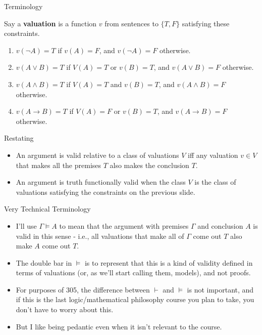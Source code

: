 \documentclass[
  ignorenonframetext,
]{beamer}
\providecommand{\tightlist}{%
  \setlength{\itemsep}{0pt}\setlength{\parskip}{0pt}}
\renewcommand{\,}{\text{, }}
\begin{document}
\begin{frame}{Terminology}
\protect\hypertarget{terminology}{}

Say a \textbf{valuation} is a function \(v\) from sentences to
\(\{T, F\}\) satisfying these constraints.

\begin{enumerate}
\tightlist
\item
  \(v(\neg A) = T\) if \(v(A) = F\), and \(v(\neg A) = F\) otherwise.
\item
  \(v(A \vee B) = T\) if \(V(A) = T\) or \(v(B) = T\), and
  \(v(A \vee B) = F\) otherwise.
\item
  \(v(A \wedge B) = T\) if \(V(A) = T\) and \(v(B) = T\), and
  \(v(A \wedge B) = F\) otherwise.
\item
  \(v(A \rightarrow B) = T\) if \(V(A) = F\) or \(v(B) = T\), and
  \(v(A \rightarrow B) = F\) otherwise.
\end{enumerate}

\end{frame}

\begin{frame}{Restating}
\protect\hypertarget{restating}{}

\begin{itemize}[<+->]
\tightlist
\item
  An argument is valid relative to a class of valuations \(V\) iff any
  valuation \(v \in V\) that makes all the premises \(T\) also makes the
  conclusion \(T\).
\item
  An argument is truth functionally valid when the class \(V\) is the
  class of valuations satisfying the constraints on the previous slide.
\end{itemize}

\end{frame}

\begin{frame}{Very Technical Terminology}
\protect\hypertarget{very-technical-terminology}{}

\begin{itemize}
\tightlist
\item
  I'll use \(\Gamma \vDash A\) to mean that the argument with premises
  \(\Gamma\) and conclusion \(A\) is valid in this sense - i.e., all
  valuations that make all of \(\Gamma\) come out \(T\) also make \(A\)
  come out \(T\).
\item
  The double bar in \(\vDash\) is to represent that this is a kind of
  validity defined in terms of valuations (or, as we'll start calling
  them, models), and not proofs.
\item
  For purposes of 305, the difference between \(\vdash\) and \(\vDash\)
  is not important, and if this is the last logic/mathematical
  philosophy course you plan to take, you don't have to worry about
  this.
\item
  But I like being pedantic even when it isn't relevant to the course.
\end{itemize}

\end{frame}
\end{document}
